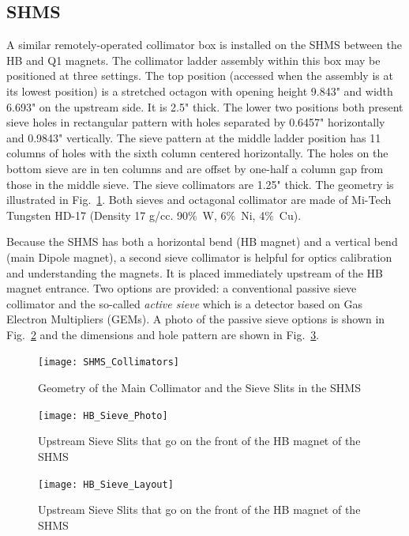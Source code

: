 {\subsection{SHMS}
\label{sssec:shms_slit}
A similar remotely-operated collimator box is installed on the SHMS between the
HB and Q1 magnets. The collimator ladder assembly within this box may be positioned
at three settings. The top position (accessed when the assembly is at its lowest
position) is a stretched octagon with opening height 9.843" and width 6.693" on the
upstream side. It is 2.5" thick. The lower two positions both present sieve holes in
rectangular pattern with holes separated by 0.6457" horizontally and 0.9843"
vertically. The sieve pattern at the middle ladder position has 11 columns of holes with
the sixth column centered horizontally. The holes on the bottom sieve are in ten
columns and are offset by one-half a column gap from those in the middle sieve.
The sieve collimators are 1.25" thick. The geometry is illustrated in Fig.~\ref{fig:SHMS_Collimators}.
Both sieves and octagonal collimator are
made of Mi-Tech\texttrademark{} Tungsten HD-17 (Density 17 g/cc. 90\%~W, 6\%~Ni, 4\%~Cu).

Because the SHMS has both a horizontal bend (HB magnet) and a vertical bend (main Dipole
magnet), a second sieve collimator is helpful for optics calibration and understanding the magnets.
It is placed immediately
upstream of the HB magnet entrance. Two options are provided: a conventional passive
sieve collimator and the so-called \textit{active sieve} which is a detector based on Gas Electron
Multipliers (GEMs).  A photo of the passive sieve options is shown in Fig.~\ref{fig:HB_Sieve_Photo}
and the dimensions and hole pattern are shown in Fig.~\ref{fig:HB_Sieve_Layout}.

\begin{figure}
\begin{center}
\texttt{[image: SHMS\_Collimators]}
\caption{Geometry of the Main Collimator and the Sieve Slits in the SHMS \label{fig:SHMS_Collimators}}
\end{center}
\end{figure}

\begin{figure}
\texttt{[image: HB\_Sieve\_Photo]}
\caption{Upstream Sieve Slits that go on the front of the HB magnet of the SHMS \label{fig:HB_Sieve_Photo}}
\end{figure}

\begin{figure}
\texttt{[image: HB\_Sieve\_Layout]}
\caption{Upstream Sieve Slits that go on the front of the HB magnet of the SHMS \label{fig:HB_Sieve_Layout}}
\end{figure}
}%

